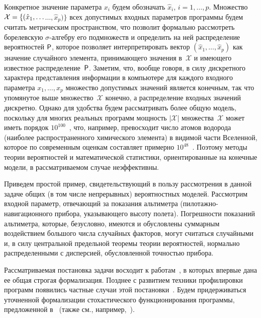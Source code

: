 \begin{multicols}{2}
Конкретное значение параметра $x_i$ будем обозначать $\hat x_i$,
$i=1,\ldots,p$. Множество $\mathcal{X}\hm=\{(\hat x_1,\ldots$\linebreak $\ldots, \hat
x_p)\}$ всех допустимых входных па\-ра\-мет\-ров программы будем считать
метрическим пространством, что позволит формально рассмотреть
борелевскую $\sigma$-ал\-геб\-ру его подмножеств и определить на ней
распределение вероятностей ${\sf P}$, которое позволяет
интерпретировать вектор $(\hat x_1,\ldots,\hat x_p)$ как значение
случайного элемента, принимающего значения в~$\mathcal{X}$ и
имеющего известное распределение~${\sf P}$. Заметим, что, вообще
говоря, в силу дискретного характера представления информации в
компьютере для каждого входного параметра $x_1,\ldots,x_p$ множество
допустимых значений является конечным, так что упомянутое выше
множество~$\mathcal{X}$ конечно, а распределение входных значений
дискретно. Однако для удобства будем рассматривать более общую
модель, поскольку для многих реальных программ мощность
$|\mathcal{X}|$ множества~$\mathcal{X}$ может иметь порядок
$10^{100}$~\cite{Palchun1989}, что, например, превосходит чис\-ло
атомов водорода (наиболее распространенного химического элемента) в
видимой части Вселенной, которое по современным оценкам составляет
примерно $10^{48}$~\cite{Parnov1967}. Поэтому методы теории
вероятностей и математической статистики, ориентированные на
конечные модели, в рассматриваемом случае неэффективны.

Приведем простой пример, свидетельствующий в пользу рассмотрения в
данной задаче общих (в том числе непрерывных) вероятностных моделей.\linebreak
Рассмотрим входной параметр, отве\-ча\-ющий за показания альтиметра
(пи\-ло\-таж\-но-на\-ви\-га\-ци\-он\-но\-го прибора, указывающего высоту полета).
Погрешности показаний альтиметра, которые, безусловно, имеются и
обусловлены суммарным воздейст\-ви\-ем большого числа случайных
факторов, могут считаться случайными и, в силу центральной
предельной теоремы теории вероятностей, нормально распределенными с
дисперсией, обусловленной точностью прибора.

Рассматриваемая постановка задачи восходит к работам~\cite{SmelyanskiAlanko1986, SmelyanskiGuryevBahmurov1986}, в которых
впервые дана ее общая строгая формализация. Позднее с развитием
техники профилировки программ появились частные случаи этой
постановки~\cite{YoufengLarus1994, BallLarus1994}. Будем
придерживаться уточненной формализации стохастического
функционирования программы, предложенной в~\cite{Korolev1994} (также
см., например,~\cite{KorolevSokolov2006}).


\end{multicols}
